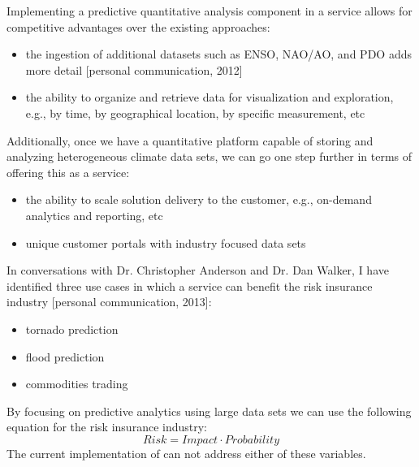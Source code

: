 Implementing a predictive quantitative analysis component in a \ce service allows for competitive advantages over the existing approaches:
\begin{itemize}
    \item{the ingestion of additional datasets such as \textsc{ENSO}, \textsc{NAO/AO}, and \textsc{PDO} adds more detail [personal communication, 2012]}
    \item the ability to organize and retrieve data for visualization and exploration, e.g., by time, by geographical location, by specific measurement, etc
\end{itemize}
Additionally, once we have a quantitative platform capable of storing and analyzing heterogeneous climate data sets, we can go one step further in terms of offering this as a service:
\begin{itemize}
    \item{the ability to scale solution delivery to the customer, e.g., on-demand analytics and reporting, etc}
    \item{unique customer portals with industry focused data sets}
\end{itemize}
In conversations with Dr. Christopher Anderson and Dr. Dan Walker, I have identified three use cases in which a \ce service can benefit the risk insurance industry [personal communication, 2013]:
\begin{itemize}
    \item tornado prediction
    \item flood prediction
    \item commodities trading
\end{itemize}
By focusing on predictive analytics using large data sets we can use the following equation for the risk insurance industry:
\begin{equation*}
    Risk = Impact \cdot Probability
\end{equation*}
The current implementation of \climatedge can not address either of these variables.

\renewcommand\bibname{{References}}


